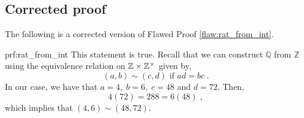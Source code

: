 \clearpage
\subsection{Corrected proof}

The following is a corrected version of Flawed Proof \ref{flaw:rat_from_int}. %

\begin{prf}{prf:rat_from_int} %
This statement is true. Recall that we can construct $\mathbb{Q}$ from $\mathbb{Z}$ using the equivalence relation on $\mathbb Z \times \mathbb Z^\times$ given by,
$$(a,b) \sim (c,d) \text{ if } ad = bc\;.$$
In our case, we have that $a = 4, \;b=6, \;c=48$ and $d=72.$ Then,
$$4(72) = 288 = 6(48)\;,$$
which implies that $(4,6) \sim (48,72).$
\end{prf}
